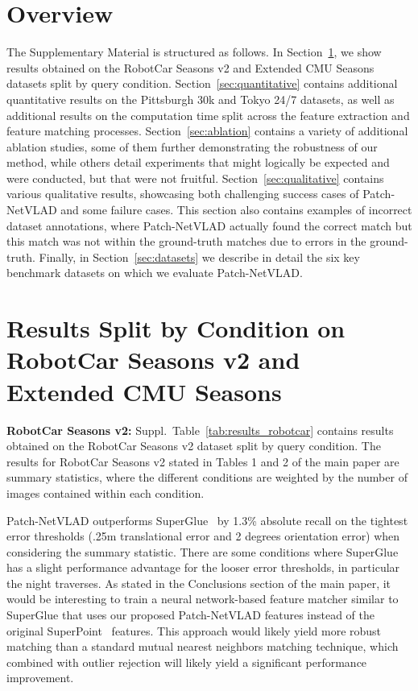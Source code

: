 \section*{Overview}
The Supplementary Material is structured as follows. In Section~\ref{sec:resultscondition}, we show results obtained on the RobotCar Seasons v2 and Extended CMU Seasons datasets split by query condition. Section~\ref{sec:quantitative} contains additional quantitative results on the Pittsburgh 30k and Tokyo 24/7 datasets, as well as additional results on the computation time split across the feature extraction and feature matching processes. Section~\ref{sec:ablation} contains a variety of additional ablation studies, some of them further demonstrating the robustness of our method, while others detail experiments that might logically be expected and were conducted, but that were not fruitful. Section~\ref{sec:qualitative} contains various qualitative results, showcasing both challenging success cases of Patch-NetVLAD and some failure cases. This section also contains examples of incorrect dataset annotations, where Patch-NetVLAD actually found the correct match but this match was not within the ground-truth matches due to errors in the ground-truth. Finally, in Section~\ref{sec:datasets} we describe in detail the six key benchmark datasets on which we evaluate Patch-NetVLAD.

\section{Results Split by Condition on RobotCar Seasons v2 and Extended CMU Seasons}
\label{sec:resultscondition}


\textbf{RobotCar Seasons v2:} 
Suppl.~Table~\ref{tab:results_robotcar} contains results obtained on the RobotCar Seasons v2 dataset split by query condition. The results for RobotCar Seasons v2 stated in Tables 1 and 2 of the main paper are summary statistics, where the different conditions are weighted by the number of images contained within each condition.

Patch-NetVLAD outperforms SuperGlue~\cite{sarlin20superglue} by 1.3\% absolute recall on the tightest error thresholds (.25m translational error and 2 degrees orientation error) when considering the summary statistic. There are some conditions where SuperGlue has a slight performance advantage for the looser error thresholds, in particular the night traverses. As stated in the Conclusions section of the main paper, it would be interesting to train a neural network-based feature matcher similar to SuperGlue that uses our proposed Patch-NetVLAD features instead of the original SuperPoint~\cite{detone2018superpoint} features. This approach would likely yield more robust matching than a standard mutual nearest neighbors matching technique, which combined with outlier rejection will likely yield a significant performance improvement.

